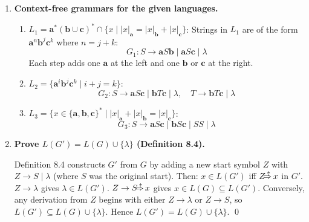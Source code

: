 \begin{enumerate}[{8.}1. ]
The grammar $G$ has $SB \to \pmb{b}S$ but $G''$ has $TB \to \pmb{b}T$ with $S \to T$ and $T \to \lambda$. The difference is that $G$ allows $S$ to be rewritten to $\lambda$ directly, while $G''$ uses $T$ as an intermediary. In $G$, the production $S \to \lambda$ can fire while $B$'s are still present (e.g., $\pmb{a}SB\pmb{c} \Rightarrow \pmb{a}B\pmb{c}$ by $S \to \lambda$, then $\pmb{a}B\pmb{c}$ is stuck since $B$ cannot be eliminated without an $S$ or $c$ context). In $G''$, $T$ can only go to $\lambda$ when all $B$'s have been converted. Thus $G$ may generate strings with leftover nonterminals (dead derivations), while $G''$ is designed to always complete. Formally: $\pmb{aaSBBcc} \Rightarrow^* \pmb{aaBBcc}$ in $G$ (using $S\to\lambda$), which is stuck. In $G''$ this cannot happen since $T$ only appears in the rule $TB \to \pmb{b}T$. So $G$ does not generate $\pmb{aabbcc}$ in the same way, and the two grammars may differ on some strings.

\item \textbf{Context-free grammars for the given languages.}

\begin{enumerate}
\item $L_1 = \pmb{a}^*(\pmb{b}\cup\pmb{c})^* \cap \{x \mid |x|_{\pmb{a}} = |x|_{\pmb{b}} + |x|_{\pmb{c}}\}$:
Strings in $L_1$ are of the form $\pmb{a}^n\pmb{b}^j\pmb{c}^k$ where $n = j+k$:
\[
G_1: S \to \pmb{a}S\pmb{b} \mid \pmb{a}S\pmb{c} \mid \lambda
\]
Each step adds one $\pmb{a}$ at the left and one $\pmb{b}$ or $\pmb{c}$ at the right.

\item $L_2 = \{\pmb{a}^i\pmb{b}^j\pmb{c}^k \mid i+j=k\}$:
\[
G_2: S \to \pmb{a}S\pmb{c} \mid \pmb{b}T\pmb{c} \mid \lambda, \quad T \to \pmb{b}T\pmb{c} \mid \lambda
\]

\item $L_3 = \{x \in \{\pmb{a},\pmb{b},\pmb{c}\}^* \mid |x|_{\pmb{a}} + |x|_{\pmb{b}} = |x|_{\pmb{c}}\}$:
\[
G_3: S \to \pmb{a}S\pmb{c} \mid \pmb{b}S\pmb{c} \mid SS \mid \lambda
\]
\end{enumerate}

\item \textbf{Prove $L(G') = L(G) \cup \{\lambda\}$ (Definition 8.4).}

Definition 8.4 constructs $G'$ from $G$ by adding a new start symbol $Z$ with $Z \to S \mid \lambda$ (where $S$ was the original start). Then:
$x \in L(G')$ iff $Z \DRightarrow x$ in $G'$.
$Z \to \lambda$ gives $\lambda \in L(G')$.
$Z \to S \DRightarrow x$ gives $x \in L(G) \subseteq L(G')$.
Conversely, any derivation from $Z$ begins with either $Z \to \lambda$ or $Z \to S$, so $L(G') \subseteq L(G) \cup \{\lambda\}$.
Hence $L(G') = L(G) \cup \{\lambda\}$. \qed


\end{enumerate}
